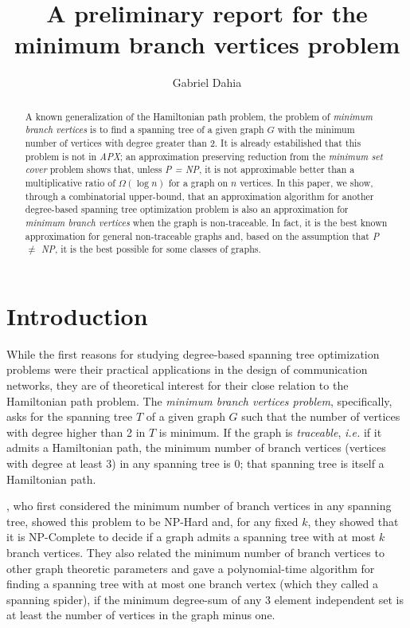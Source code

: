 \documentclass[12pt]{article}
\title{A preliminary report for the minimum branch vertices problem}
\author{Gabriel Dahia\inst{1}}
\begin{document}
 

\maketitle

\begin{abstract}
  A known generalization of the Hamiltonian path problem, the problem of \emph{minimum branch vertices} is to find a spanning tree of a given graph $G$ with the minimum number of vertices with degree greater than 2.
  It is already estabilished that this problem is not in \emph{APX}; an approximation preserving reduction from the \emph{minimum set cover} problem shows that, unless \emph{P = NP}, it is not approximable better than a multiplicative ratio of $\Omega(\log n )$ for a graph on $n$ vertices.
  In this paper, we show, through a combinatorial upper-bound, that an approximation algorithm for another degree-based spanning tree optimization problem is also an approximation for \emph{minimum branch vertices} when the graph is non-traceable.
  In fact, it is the best known approximation for general non-traceable graphs and, based on the assumption that \emph{P $\neq$ NP}, it is the best possible for some classes of graphs.
\end{abstract}
     
\section{Introduction}

While the first reasons for studying degree-based spanning tree optimization problems were their practical applications in the design of communication networks, they are of theoretical interest for their close relation to the Hamiltonian path problem.
The \emph{minimum branch vertices problem}, specifically, asks for the spanning tree $T$ of a given graph $G$ such that the number of vertices with degree higher than 2 in $T$ is minimum.
If the graph is \emph{traceable}, \emph{i.e.} if it admits a Hamiltonian path, the minimum number of branch vertices (vertices with degree at least 3) in any spanning tree is 0; that spanning tree is itself a Hamiltonian path.

\cite{gargano2002, gargano2004}, who first considered the minimum number of branch vertices in any spanning tree, showed this problem to be NP-Hard and, for any fixed $k$, they showed that it is NP-Complete to decide if a graph admits a spanning tree with at most $k$ branch vertices. 
They also related the minimum number of branch vertices to other graph theoretic parameters and gave a polynomial-time algorithm for finding a spanning tree with at most one branch vertex (which they called a spanning spider), if the minimum degree-sum of any 3 element independent set is at least the number of vertices in the graph minus one.
\end{document}
